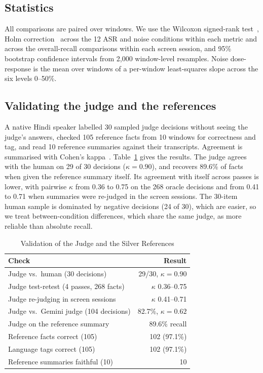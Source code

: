 \documentclass[conference]{IEEEtran}
\begin{document}
\subsection{Statistics}
All comparisons are paired over windows. We use the Wilcoxon signed-rank test~\cite{wilcoxon1945}, Holm correction~\cite{holm1979} across the 12 ASR and noise conditions within each metric and across the overall-recall comparisons within each screen session, and 95\% bootstrap confidence intervals from 2,000 window-level resamples. Noise dose-response is the mean over windows of a per-window least-squares slope across the six levels 0--50\%.

\subsection{Validating the judge and the references}
A native Hindi speaker labelled 30 sampled judge decisions without seeing the judge's answers, checked 105 reference facts from 10 windows for correctness and tag, and read 10 reference summaries against their transcripts. Agreement is summarised with Cohen's kappa~\cite{cohen1960}. Table~\ref{tab:valid} gives the results. The judge agrees with the human on 29 of 30 decisions ($\kappa = 0.90$), and recovers 89.6\% of facts when given the reference summary itself. Its agreement with itself across passes is lower, with pairwise $\kappa$ from 0.36 to 0.75 on the 268 oracle decisions and from 0.41 to 0.71 when summaries were re-judged in the screen sessions. The 30-item human sample is dominated by negative decisions (24 of 30), which are easier, so we treat between-condition differences, which share the same judge, as more reliable than absolute recall.

\begin{table}[t]
\caption{Validation of the Judge and the Silver References}
\label{tab:valid}
\centering
\begin{tabular}{lr}
\toprule
Check & Result \\
\midrule
Judge vs.\ human (30 decisions) & 29/30, $\kappa = 0.90$ \\
Judge test-retest (4 passes, 268 facts) & $\kappa$ 0.36--0.75 \\
Judge re-judging in screen sessions & $\kappa$ 0.41--0.71 \\
Judge vs.\ Gemini judge (104 decisions) & 82.7\%, $\kappa = 0.62$ \\
Judge on the reference summary & 89.6\% recall \\
Reference facts correct (105) & 102 (97.1\%) \\
Language tags correct (105) & 102 (97.1\%) \\
Reference summaries faithful (10) & 10 \\
\bottomrule
\end{tabular}
\end{table}
\end{document}
